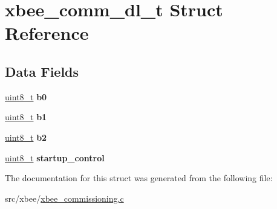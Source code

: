 \hypertarget{structxbee__comm__dl__t}{}\section{xbee\+\_\+comm\+\_\+dl\+\_\+t Struct Reference}
\label{structxbee__comm__dl__t}
\subsection*{Data Fields}
\begin{DoxyCompactItemize}
\item 
\hyperlink{group__hal__dos_gae1affc9ca37cfb624959c866a73f83c2}{uint8\+\_\+t} {\bfseries b0}
\item 
\hyperlink{group__hal__dos_gae1affc9ca37cfb624959c866a73f83c2}{uint8\+\_\+t} {\bfseries b1}
\item 
\hyperlink{group__hal__dos_gae1affc9ca37cfb624959c866a73f83c2}{uint8\+\_\+t} {\bfseries b2}
\item 
\hyperlink{group__hal__dos_gae1affc9ca37cfb624959c866a73f83c2}{uint8\+\_\+t} {\bfseries startup\+\_\+control}
\end{DoxyCompactItemize}


The documentation for this struct was generated from the following file\+:\begin{DoxyCompactItemize}
\item 
src/xbee/\hyperlink{xbee__commissioning_8c}{xbee\+\_\+commissioning.\+c}\end{DoxyCompactItemize}
